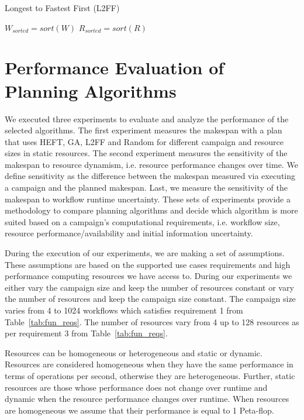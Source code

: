 \begin{algorithm}[ht]
    \caption{Longest to Fastest First (L2FF)}
    \label{alg:l2ff}
    \begin{algorithmic}[1]
        \State \texttt{$W_{sorted}=sort(W)$} 
        \State \texttt{$R_{sorted}=sort(R)$}
        \EndFor
        \EndProcedure
    \end{algorithmic}
\end{algorithm}

\section{Performance Evaluation of Planning Algorithms}
\label{sec:algo_perf_comp}

We executed three experiments to evaluate and analyze the performance of the selected algorithms.
The first experiment measures the makespan with a plan that uses HEFT, GA, L2FF and Random for different campaign and resource sizes in static resources.
The second experiment measures the sensitivity of the makespan to resource dynamism, i.e. resource performance changes over time.
We define sensitivity as the difference between the makespan measured via executing a campaign and the planned makespan.
Last, we measure the sensitivity of the makespan to workflow runtime uncertainty.
These sets of experiments provide a methodology to compare planning algorithms and decide which algorithm is more suited based on a campaign's computational requirements, i.e. workflow size, resource performance/availability and initial information uncertainty.

During the execution of our experiments, we are making a set of assumptions.
These assumptions are based on the supported use cases requirements and high performance computing resources we have access to.
During our experiments we either vary the campaign size and keep the number of resources constant or vary the number of resources and keep the campaign size constant.
The campaign size varies from 4 to 1024 workflows which satisfies requirement 1 from Table~\ref{tab:fun_reqs}.
The number of resources vary from 4 up to 128 resources as per requirement 3 from Table~\ref{tab:fun_reqs}.

Resources can be homogeneous or heterogeneous and static or dynamic.
Resources are considered homogeneous when they have the same performance in terms of operations per second, otherwise they are heterogeneous.
Further, static resources are those whose performance does not change over runtime and dynamic when the resource performance changes over runtime.
When resources are homogeneous we assume that their performance is equal to 1 Peta-flop.

